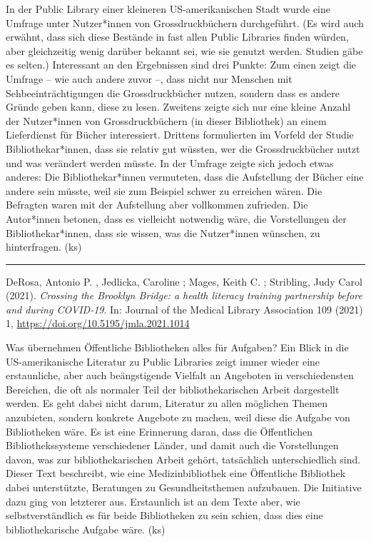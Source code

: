 \documentclass[a4paper,
fontsize=11pt,
oneside,
numbers=noperiodatend,
parskip=half-,
bibliography=totoc,
final
]{scrartcl}
\begin{document}
In der Public Library einer kleineren US-amerikanischen Stadt wurde eine
Umfrage unter Nutzer*innen von Grossdruckbüchern durchgeführt. (Es wird
auch erwähnt, dass sich diese Bestände in fast allen Public Libraries
finden würden, aber gleichzeitig wenig darüber bekannt sei, wie sie
genutzt werden. Studien gäbe es selten.) Interessant an den Ergebnissen
sind drei Punkte: Zum einen zeigt die Umfrage -- wie auch andere zuvor
--, dass nicht nur Menschen mit Sehbeeinträchtigungen die
Grossdruckbücher nutzen, sondern dass es andere Gründe geben kann, diese
zu lesen. Zweitens zeigte sich nur eine kleine Anzahl der Nutzer*innen
von Grossdruckbüchern (in dieser Bibliothek) an einem Lieferdienst für
Bücher interessiert. Drittens formulierten im Vorfeld der Studie
Bibliothekar*innen, dass sie relativ gut wüssten, wer die
Grossdruckbücher nutzt und was verändert werden müsste. In der Umfrage
zeigte sich jedoch etwas anderes: Die Bibliothekar*innen vermuteten,
dass die Aufstellung der Bücher eine andere sein müsste, weil sie zum
Beispiel schwer zu erreichen wären. Die Befragten waren mit der
Aufstellung aber vollkommen zufrieden. Die Autor*innen betonen, dass es
vielleicht notwendig wäre, die Vorstellungen der Bibliothekar*innen,
dass sie wissen, was die Nutzer*innen wünschen, zu hinterfragen. (ks)

\begin{center}\rule{0.5\linewidth}{0.5pt}\end{center}

DeRosa, Antonio P. , Jedlicka, Caroline ; Mages, Keith C. ; Stribling,
Judy Carol (2021). \emph{Crossing the Brooklyn Bridge: a health literacy
training partnership before and during COVID-19}. In: Journal of the
Medical Library Association 109 (2021) 1,
\url{https://doi.org/10.5195/jmla.2021.1014}

Was übernehmen Öffentliche Bibliotheken alles für Aufgaben? Ein Blick in
die US-amerikanische Literatur zu Public Libraries zeigt immer wieder
eine erstaunliche, aber auch beängstigende Vielfalt an Angeboten in
verschiedensten Bereichen, die oft als normaler Teil der
bibliothekarischen Arbeit dargestellt werden. Es geht dabei nicht darum,
Literatur zu allen möglichen Themen anzubieten, sondern konkrete
Angebote zu machen, weil diese die Aufgabe von Bibliotheken wäre. Es ist
eine Erinnerung daran, dass die Öffentlichen Bibliothekssysteme
verschiedener Länder, und damit auch die Vorstellungen davon, was zur
bibliothekarischen Arbeit gehört, tatsächlich unterschiedlich sind.
Dieser Text beschreibt, wie eine Medizinbibliothek eine Öffentliche
Bibliothek dabei unterstützte, Beratungen zu Gesundheitsthemen
aufzubauen. Die Initiative dazu ging von letzterer aus. Erstaunlich ist
an dem Texte aber, wie selbstverständlich es für beide Bibliotheken zu
sein schien, dass dies eine bibliothekarische Aufgabe wäre. (ks)
\end{document}
